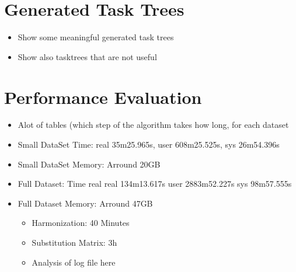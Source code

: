 \section{Generated Task Trees}
\begin{itemize}
	\item Show some meaningful generated task trees
	\item Show also tasktrees that are not useful
\end{itemize}
\section{Performance Evaluation}

\begin{itemize}
	\item Alot of tables (which step of the algorithm takes how long, for each dataset

	\item Small DataSet Time: real    35m25.965s, user    608m25.525s, sys     26m54.396s
	\item Small DataSet Memory: Arround 20GB
	\item Full Dataset: Time real    real    134m13.617s user    2883m52.227s sys     98m57.555s
	\item Full Dataset Memory: Arround 47GB

		\begin{itemize}
			\item Harmonization: 40 Minutes
			\item Substitution Matrix: 3h
			\item Analysis of log file here
		\end{itemize}


\end{itemize}

